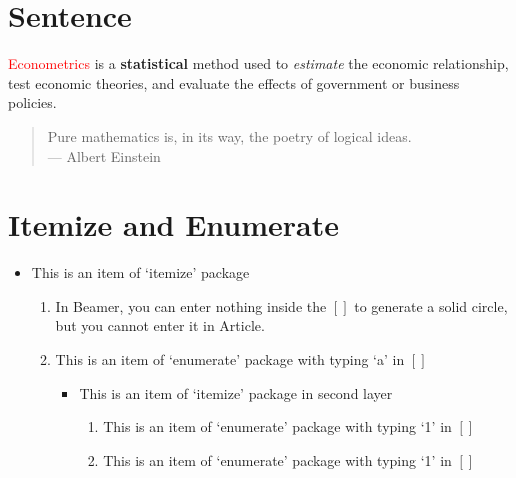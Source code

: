 \documentclass[utf8,12pt]{article} %
\begin{document}
\section{Sentence}
\begin{spacing}{1.5}
%
 \textcolor{red}{Econometrics} is a \textbf{statistical} method used to \textit{estimate} the economic relationship,
 	test economic theories, and evaluate the effects of government or business policies.

\begin{quote}
	Pure mathematics is, in its way, the poetry of logical ideas.\\
	--- Albert Einstein
\end{quote}
%
\end{spacing}
%
%
\newpage
\section{Itemize and Enumerate}
\begin{spacing}{1.5}
%
\begin{itemize} %
\item This is an item of `itemize' package
		\begin{enumerate}[a] %
			\item In Beamer, you can enter nothing inside the $[]$ to generate a solid circle, but you cannot enter it in Article.
			\item This is an item of `enumerate' package with typing `a' in $[]$
			\begin{itemize} %
				\item This is an item of `itemize' package in second layer
				\begin{enumerate}[1] %
					\item This is an item of `enumerate' package with typing `1' in $[]$
					\item This is an item of `enumerate' package with typing `1' in $[]$
				\end{enumerate}
			\end{itemize}
		\end{enumerate}
\end{itemize}
\end{spacing}
%
%
\end{document}
